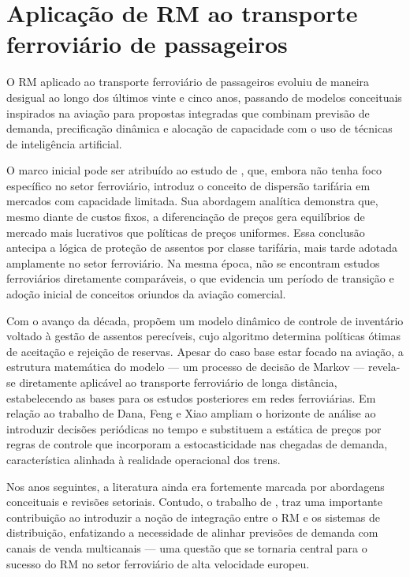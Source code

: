 \section{Aplicação de RM ao transporte ferroviário de passageiros}
O RM aplicado ao transporte ferroviário de passageiros evoluiu de maneira desigual ao longo dos últimos vinte e cinco anos, passando de modelos conceituais inspirados na aviação para propostas integradas que combinam previsão de demanda, precificação dinâmica e alocação de capacidade com o uso de técnicas de inteligência artificial.

O marco inicial pode ser atribuído ao estudo de \cite{Dana1999}, que, embora não tenha foco específico no setor ferroviário, introduz o conceito de dispersão tarifária em mercados com capacidade limitada. Sua abordagem analítica demonstra que, mesmo diante de custos fixos, a diferenciação de preços gera equilíbrios de mercado mais lucrativos que políticas de preços uniformes. Essa conclusão antecipa a lógica de proteção de assentos por classe tarifária, mais tarde adotada amplamente no setor ferroviário. Na mesma época, não se encontram estudos ferroviários diretamente comparáveis, o que evidencia um período de transição e adoção inicial de conceitos oriundos da aviação comercial.

Com o avanço da década, \citep{Feng2001} propõem um modelo dinâmico de controle de inventário voltado à gestão de assentos perecíveis, cujo algoritmo determina políticas ótimas de aceitação e rejeição de reservas. Apesar do caso base estar focado na aviação, a estrutura matemática do modelo — um processo de decisão de Markov — revela-se diretamente aplicável ao transporte ferroviário de longa distância, estabelecendo as bases para os estudos posteriores em redes ferroviárias. Em relação ao trabalho de Dana, Feng e Xiao ampliam o horizonte de análise ao introduzir decisões periódicas no tempo e substituem a estática de preços por regras de controle que incorporam a estocasticidade nas chegadas de demanda, característica alinhada à realidade operacional dos trens.

Nos anos seguintes, a literatura ainda era fortemente marcada por abordagens conceituais e revisões setoriais. Contudo, o trabalho de \citep{Vinod2004}, traz uma importante contribuição ao introduzir a noção de integração entre o RM e os sistemas de distribuição, enfatizando a necessidade de alinhar previsões de demanda com canais de venda multicanais — uma questão que se tornaria central para o sucesso do RM no setor ferroviário de alta velocidade europeu.

